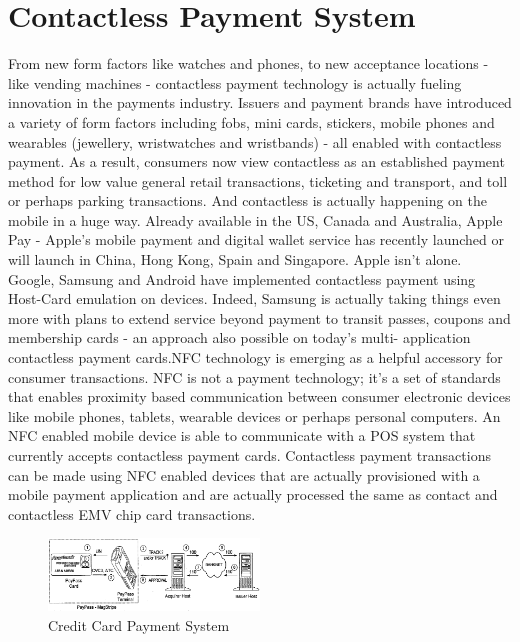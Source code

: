\documentclass[conference]{IEEEtran}
\begin{document}
\section{Contactless Payment System}
From new form factors like watches and phones, to new acceptance locations - like vending machines - contactless payment technology is actually fueling innovation in the payments industry. Issuers
and payment brands have introduced a variety of form factors including fobs, mini cards, stickers,
mobile phones and wearables (jewellery, wristwatches and wristbands) - all enabled with contactless payment.
As a result, consumers now view contactless as an established payment method for low value general retail transactions, ticketing and transport, and toll or perhaps parking transactions.
And contactless is actually happening on the mobile in a huge way. Already available in the US, Canada and
Australia, Apple Pay - Apple's mobile payment and digital wallet service has recently launched or will launch in China, Hong Kong, Spain and Singapore. Apple isn't alone. Google, Samsung and Android have implemented contactless payment using Host-Card emulation on devices. Indeed, Samsung is actually taking things even more with
plans to extend service beyond payment to transit passes, coupons and membership cards - an approach also possible on today's multi- application contactless payment cards.NFC technology is emerging as a helpful accessory for consumer transactions. NFC is not a payment technology; it's a set of standards that
enables proximity based communication between consumer electronic devices like mobile phones, tablets, wearable devices or perhaps personal computers. An NFC enabled mobile device is able to communicate with
a POS system that currently accepts contactless payment cards. Contactless payment transactions can
be made using NFC enabled devices that are actually provisioned with a mobile
payment application and are actually processed the same as contact and contactless EMV chip card transactions.
\begin{figure}[h]
\includegraphics[width=0.5\textwidth]{cc}
\caption{Credit Card Payment System}
\end{figure}
\end{document}
